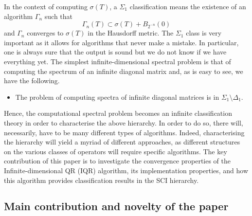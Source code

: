 \documentclass[a4paper,10pt]{article}
\begin{document}
In the context of computing $\sigma(T)$, a $\Sigma_1$ classification means the existence of an algorithm $\Gamma_n$ such that
$$
\Gamma_n(T)\subset \sigma(T)+B_{2^{-n}}(0)
$$
and $\Gamma_n$ converges to $\sigma(T)$ in the Hausdorff metric. The $\Sigma_1$ class is very important as it allows for algorithms that never make a mistake. In particular, one is always sure that the output is sound but we do not know if we have everything yet. The simplest infinite-dimensional spectral problem is that of computing the spectrum of an infinite diagonal matrix and, as is easy to see, we have the following.

\begin{itemize}
\itemsep0em
\item[(iv)] The problem of computing spectra of infinite diagonal matrices is in $\Sigma_1\setminus \Delta_1$.
\end{itemize}


Hence, the computational spectral problem becomes an infinite classification theory in order to characterise the above hierarchy. In order to do so, there will, necessarily, have to be many different types of algorithms. Indeed, characterising the hierarchy will yield a myriad of different approaches, as different structures on the various classes of operators will require specific algorithms. The key contribution of this paper is to investigate the convergence properties of the Infinite-dimensional QR (IQR) algorithm, its implementation properties, and how this algorithm provides classification results in the SCI hierarchy. 


\subsection{Main contribution and novelty of the paper}
\end{document}
